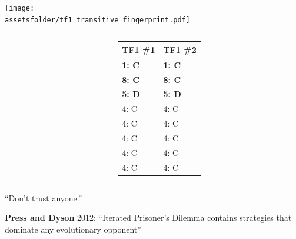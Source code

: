 \documentclass{beamer}
\newcommand{\assetsfolder}{./assets}
\newcommand{\researchfolder}{$HOME/rsc/axelrod-moran}
\begin{document}
\begin{frame}
    \begin{center}
        \texttt{[image: \\assetsfolder/tf1\_transitive\_fingerprint.pdf]}
    \end{center}
\end{frame}

\begin{frame}
    \begin{columns}
        \begin{column}{.6\textwidth}
            \begin{center}
                \scalebox{.49}{
                    
                }
            \end{center}
        \end{column}

        \begin{column}{.4\textwidth}
            \small
            \begin{tabular}{ll}
                \toprule
                TF1 \#1   & TF1 \#2\\
                \midrule
                \bf{1}: C & \bf{1}: C  \\
                \bf{8}: C & \bf{8}: C  \\
                \bf{5}: D & \bf{5}: D  \\
                4: C      & 4: C  \\
                4: C      & 4: C  \\
                4: C      & 4: C  \\
                4: C      & 4: C  \\
                4: C      & 4: C  \\
                \bottomrule
            \end{tabular}
        \end{column}
    \end{columns}
\end{frame}

\begin{frame}
    \begin{center}
        \Huge ``Don't trust anyone.''
    \end{center}
\end{frame}

\begin{frame}
    \begin{center}
        \Large \textbf{Press and Dyson} 2012: ``Iterated Prisoner’s Dilemma contains
        strategies that dominate any evolutionary opponent''
    \end{center}
\end{frame}
\end{document}
